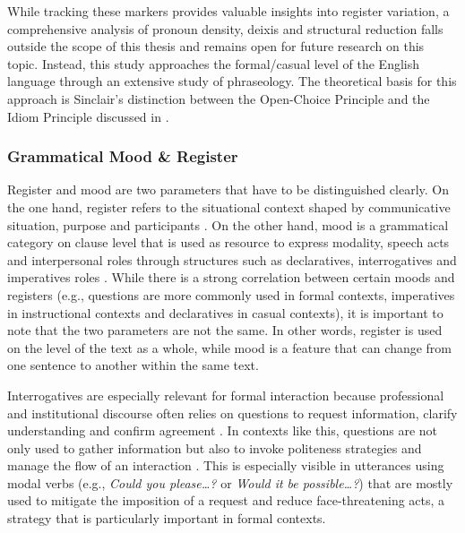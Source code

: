 \documentclass[11pt,a4paper]{article}
\begin{document}
While tracking these markers provides valuable insights into register variation, a comprehensive analysis of pronoun density, deixis and structural reduction falls outside the scope of this thesis and remains open for future research on this topic. Instead, this study approaches the formal/casual level of the English language through an extensive study of phraseology. The theoretical basis for this approach is Sinclair's \parencite*{sinclairCorpusConcordanceCollocation1991} distinction between the Open-Choice Principle and the Idiom Principle discussed in . 

\subsubsection{Grammatical Mood \& Register}\label{subsubsec:mood-register}

Register and mood are two parameters that have to be distinguished clearly. On the one hand, register refers to the situational context shaped by communicative situation, purpose and participants \parencite[229]{biber1993using}. On the other hand, mood is a grammatical category on clause level that is used as resource to express modality, speech acts and interpersonal roles through structures such as declaratives, interrogatives and imperatives  roles \parencite[134--135]{hallidayMatthiessenIntroductionFunctional2014}. While there is a strong correlation between certain moods and registers (e.g., questions are more commonly used in formal contexts, imperatives in instructional contexts and declaratives in casual contexts), it is important to note that the two parameters are not the same. In other words, register is used on the level of the text as a whole, while mood is a feature that can change from one sentence to another within the same text.

Interrogatives are especially relevant for formal interaction because professional and institutional discourse often relies on questions to request information, clarify understanding and confirm agreement \parencite[5]{biberUniversityLanguageCorpusbased2006}. In contexts like this, questions are not only used to gather information but also to invoke politeness strategies and manage the flow of an interaction \parencite{brownpenelopeQuestionsPolitenessStrategies1978}. This is especially visible in utterances using modal verbs (e.g., \textit{Could you please\ldots?} or \textit{Would it be possible\ldots?}) that are mostly used to mitigate the imposition of a request and reduce face-threatening acts, a strategy that is particularly important in formal contexts.
\end{document}
